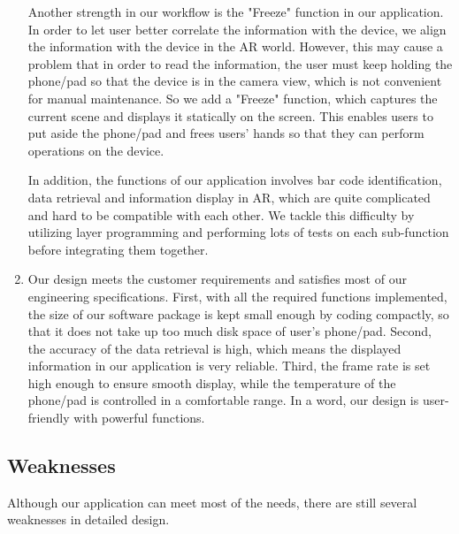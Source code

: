 \documentclass[11pt,a4paper]{article}
\begin{document}
\begin{onehalfspace}
\begin{enumerate}
    Another strength in our workflow is the "Freeze" function in our application. In order to let user better correlate the information with the device, we align the information with the device in the AR world. However, this may cause a problem that in order to read the information, the user must keep holding the phone/pad so that the device is in the camera view, which is not convenient for manual maintenance. So we add a "Freeze" function, which captures the current scene and displays it statically on the screen. This enables users to put aside the phone/pad and frees users' hands so that they can perform operations on the device. 
    
    In addition, the functions of our application involves bar code identification, data retrieval and information display in AR, which are quite complicated and hard to be compatible with each other. We tackle this difficulty by utilizing layer programming and performing lots of tests on each sub-function before integrating them together. 
    
    \item Our design meets the customer requirements and satisfies most of our engineering specifications. First, with all the required functions implemented, the size of our software package is kept small enough by coding compactly, so that it does not take up too much disk space of user's phone/pad. Second, the accuracy of the data retrieval is high, which means the displayed information in our application is very reliable. Third, the frame rate is set high enough to ensure smooth display, while the temperature of the phone/pad is controlled in a comfortable range. In a word, our design is user-friendly with powerful functions.
\end{enumerate}


\subsection{Weaknesses}

Although our application can meet most of the needs, there are still several weaknesses in detailed design.


\end{onehalfspace}
\end{document}
